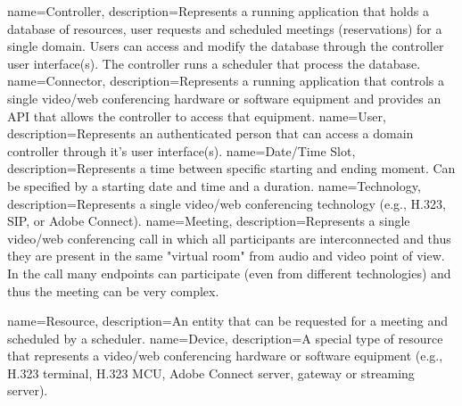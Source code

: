 %
%
{
  name=Controller,
  description={Represents a running application that holds a database of 
    resources, user requests and scheduled meetings (reservations) for a single 
    domain. Users can access and modify the database through the controller 
    user interface(s). The controller runs a scheduler that process the 
    database.}
}
{
  name=Connector,
  description={Represents a running application that controls a single 
    video/web conferencing hardware or software equipment and provides an API 
    that allows the controller to access that equipment.}
}
{
  name=User,
  description={Represents an authenticated person that can access a domain 
    controller through it's user interface(s).}
}
{
  name=Date/Time Slot,
  description={Represents a time between specific starting and ending moment. 
    Can be specified by a starting date and time and a duration.}
}
{
  name=Technology,
  description={Represents a single video/web conferencing technology (e.g., 
    H.323, SIP, or Adobe Connect).}
}
{
  name=Meeting,
  description={Represents a single video/web conferencing call in which all 
    participants  are interconnected and thus they are present in the same 
    "virtual room" from audio and video point of view. In the call many 
    endpoints can participate (even from different technologies) and thus the 
    meeting can be very complex.}
}

%
%
{
  name=Resource,
  description={An entity that can be requested for a meeting and scheduled by a 
    scheduler.}
}
{
  name=Device,
  description={A special type of resource that represents a video/web 
    conferencing hardware or software equipment (e.g., H.323 terminal, H.323 
    MCU, Adobe Connect server, gateway or streaming server).}
}

